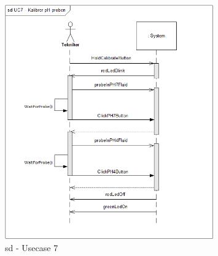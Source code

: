 \begin{figure}[H]
    \centering
    \includegraphics[width=0.8\textwidth]{Systemarkitektur/OverordnedeSekvensdiagrammer/sd_UC7.PNG}
    \caption{sd - Usecase 7}
    \label{fig:sd_UC6}
\end{figure}
